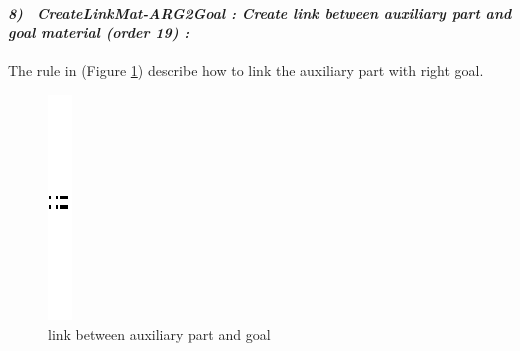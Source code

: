 \paragraph{\emph{8)~ CreateLinkMat-ARG2Goal : Create link between auxiliary part and  goal material  (order 19) :} }
 
 
The rule in (Figure \ref{fig:link between auxiliary part and goal})  describe 
how to link the auxiliary part with right goal.  
\vspace{1cm}
\begin{figure}[th]
\centering

	\quad{}\quad{}
		\includegraphics{ch3/img/sep}
	\quad{}\quad{}
  
\caption{\label{fig:link between auxiliary part and goal}link between auxiliary part and goal}
 
\end{figure}
\pagebreak
